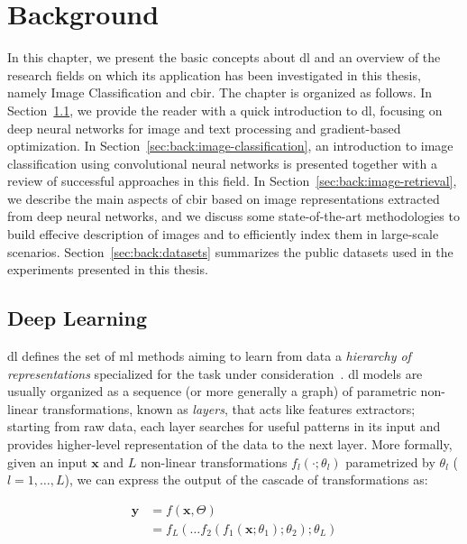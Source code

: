 
\chapter{Background}
\label{ch:background}

In this chapter, we present the basic concepts about \gls{dl} and an overview of the research fields on which its application has been investigated in this thesis, namely Image Classification and \gls{cbir}.
The chapter is organized as follows.
In Section~\ref{sec:back:deep-learning}, we provide the reader with a quick introduction to \gls{dl}, focusing on deep neural networks for image and text processing and gradient-based optimization.
In Section~\ref{sec:back:image-classification}, an introduction to image classification using convolutional neural networks is presented together with a review of successful approaches in this field.
In Section~\ref{sec:back:image-retrieval}, we describe the main aspects of \gls{cbir} based on image representations extracted from deep neural networks, and we discuss some state-of-the-art methodologies to build effecive description of images and to efficiently index them in large-scale scenarios.
Section~\ref{sec:back:datasets} summarizes the public datasets used in the experiments presented in this thesis.


\section{Deep Learning}
\label{sec:back:deep-learning}

\acrfull{dl} defines the set of \gls{ml} methods aiming to learn from data a \emph{hierarchy of representations} specialized for the task under consideration~\cite{goodfellow2016deep}.
\gls{dl} models are usually organized as a sequence (or more generally a graph) of parametric non-linear transformations, known as \emph{layers}, that acts like features extractors;
starting from raw data, each layer searches for useful patterns in its input and provides higher-level representation of the data to the next layer.
More formally, given an input $\mathbf{x}$ and $L$ non-linear transformations $f_l(\cdot; \theta_l)$ parametrized by $\theta_l$ ($l=1, \dots, L$), we can express the output  of the cascade of transformations as:

\begin{align} \label{eq:back:deepnet}
    \mathbf{y} & = f(\mathbf{x}, \Theta) \\
               & = f_L(\dots f_2(f_1(\mathbf{x}; \theta_1); \theta_2); \theta_L)
\end{align}

